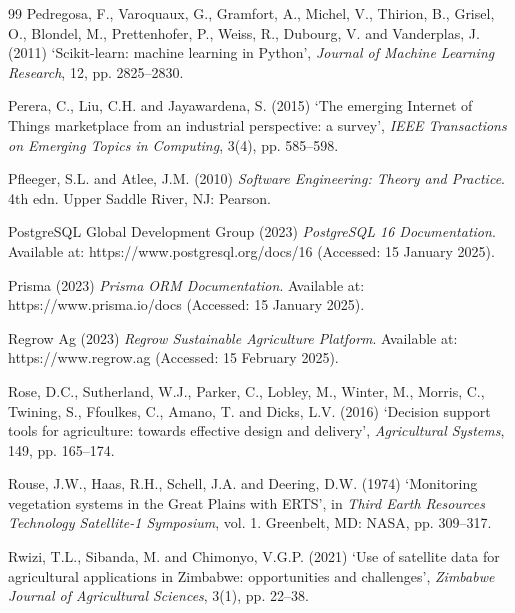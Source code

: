 \documentclass[12pt,a4paper]{report}
\begin{document}
\begin{thebibliography}{99}
Pedregosa, F., Varoquaux, G., Gramfort, A., Michel, V., Thirion, B., Grisel, O., Blondel, M., Prettenhofer, P., Weiss, R., Dubourg, V. and Vanderplas, J. (2011) `Scikit-learn: machine learning in Python', \textit{Journal of Machine Learning Research}, 12, pp. 2825--2830.

Perera, C., Liu, C.H. and Jayawardena, S. (2015) `The emerging Internet of Things marketplace from an industrial perspective: a survey', \textit{IEEE Transactions on Emerging Topics in Computing}, 3(4), pp. 585--598.

Pfleeger, S.L. and Atlee, J.M. (2010) \textit{Software Engineering: Theory and Practice}. 4th edn. Upper Saddle River, NJ: Pearson.

PostgreSQL Global Development Group (2023) \textit{PostgreSQL 16 Documentation}. Available at: https://www.postgresql.org/docs/16 (Accessed: 15 January 2025).

Prisma (2023) \textit{Prisma ORM Documentation}. Available at: https://www.prisma.io/docs (Accessed: 15 January 2025).

Regrow Ag (2023) \textit{Regrow Sustainable Agriculture Platform}. Available at: https://www.regrow.ag (Accessed: 15 February 2025).

Rose, D.C., Sutherland, W.J., Parker, C., Lobley, M., Winter, M., Morris, C., Twining, S., Ffoulkes, C., Amano, T. and Dicks, L.V. (2016) `Decision support tools for agriculture: towards effective design and delivery', \textit{Agricultural Systems}, 149, pp. 165--174.

Rouse, J.W., Haas, R.H., Schell, J.A. and Deering, D.W. (1974) `Monitoring vegetation systems in the Great Plains with ERTS', in \textit{Third Earth Resources Technology Satellite-1 Symposium}, vol. 1. Greenbelt, MD: NASA, pp. 309--317.

Rwizi, T.L., Sibanda, M. and Chimonyo, V.G.P. (2021) `Use of satellite data for agricultural applications in Zimbabwe: opportunities and challenges', \textit{Zimbabwe Journal of Agricultural Sciences}, 3(1), pp. 22--38.


\end{thebibliography}
\end{document}
